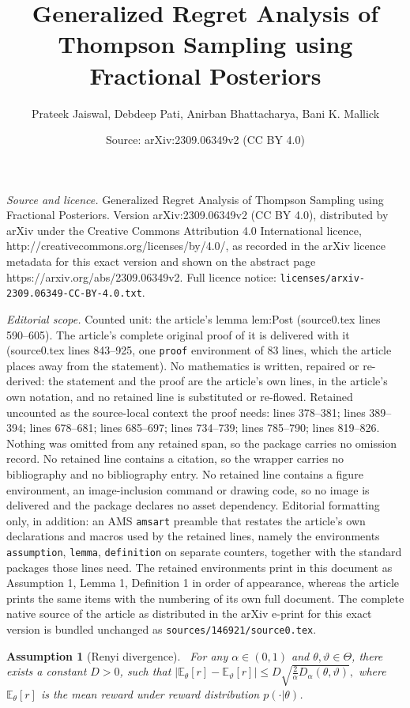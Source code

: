 \documentclass[10pt,a4paper]{amsart}
\title{Generalized Regret Analysis of Thompson Sampling using Fractional Posteriors}
\author{Prateek Jaiswal, Debdeep Pati, Anirban Bhattacharya, Bani K. Mallick}
\date{Source: arXiv:2309.06349v2 (CC BY 4.0)}
\newtheorem{assumption}{Assumption}
\def\bbE{\mathbb E}
\begin{document}
\maketitle

\noindent\emph{Source and licence.} Generalized Regret Analysis of Thompson Sampling using Fractional Posteriors. Version arXiv:2309.06349v2 (CC BY 4.0), distributed by arXiv under the Creative Commons Attribution 4.0 International licence, http://creativecommons.org/licenses/by/4.0/, as recorded in the arXiv licence metadata for this exact version and shown on the abstract page https://arxiv.org/abs/2309.06349v2. Full licence notice: \texttt{licenses/arxiv-2309.06349-CC-BY-4.0.txt}.\par\smallskip

\noindent\textit{Editorial scope.} Counted unit: the article's lemma lem:Post (source0.tex lines 590--605). The article's complete original proof of it is delivered with it (source0.tex lines 843--925, one \texttt{proof} environment of 83 lines, which the article places away from the statement). No mathematics is written, repaired or re-derived: the statement and the proof are the article's own lines, in the article's own notation, and no retained line is substituted or re-flowed.  Retained uncounted as the source-local context the proof needs: lines 378--381; lines 389--394; lines 678--681; lines 685--697; lines 734--739; lines 785--790; lines 819--826.  Nothing was omitted from any retained span, so the package carries no omission record.  No retained line contains a citation, so the wrapper carries no bibliography and no bibliography entry.  No retained line contains a figure environment, an image-inclusion command or drawing code, so no image is delivered and the package declares no asset dependency.  Editorial formatting only, in addition: an AMS \texttt{amsart} preamble that restates the article's own declarations and macros used by the retained lines, namely the environments \texttt{assumption}, \texttt{lemma}, \texttt{definition} on separate counters, together with the standard packages those lines need.  The retained environments print in this document as Assumption 1, Lemma 1, Definition 1 in order of appearance, whereas the article prints the same items with the numbering of its own full document.  The complete native source of the article as distributed in the arXiv e-print for this exact version is bundled unchanged as \texttt{sources/146921/source0.tex}.
      \begin{assumption}[Renyi divergence]~\label{ass:Renyi}
      For any $\alpha\in(0,1)$ and $\theta,\vartheta \in \Theta$, there exists a constant $D>0$, such that
     \(   |\bbE_{\theta}[r]- \bbE_{\vartheta}[r]| \leq D\sqrt{\frac{2}{\alpha} D_{\alpha}(\theta,\vartheta)},\) where $\bbE_{\theta}[r]$ is the mean reward under reward distribution $p(\cdot|\theta)$. 
\end{assumption}
\end{document}
